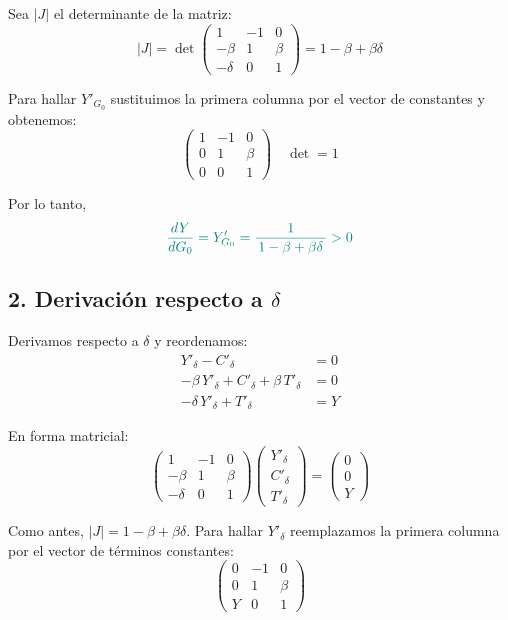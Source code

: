 \documentclass{article}
\begin{document}
Sea \(|J|\) el determinante de la matriz:
\[
|J|=\det
\begin{pmatrix}
1 & -1 & 0\\[0.8mm]
-\beta & 1 & \beta\\[0.8mm]
-\delta & 0 & 1
\end{pmatrix}
= 1 - \beta + \beta\delta
\]

Para hallar \(Y'_{G_0}\) sustituimos la primera columna por el vector de constantes y obtenemos:
\[
\begin{pmatrix}
1 & -1 & 0\\[0.8mm]
0 & 1 & \beta\\[0.8mm]
0 & 0 & 1
\end{pmatrix} \quad \det = 1
\]

Por lo tanto,
\[
\color{teal}
\frac{dY}{dG_0} = Y'_{G_0} = \frac{1}{\,1 - \beta + \beta\delta\,} > 0
\]

\bigskip
\subsection*{2. Derivación respecto a \(\delta\)}

Derivamos respecto a \(\delta\) y reordenamos:
\begin{align*}
Y'_{\delta} - C'_{\delta} &= 0 \\[1mm]
-\beta\,Y'_{\delta} + C'_{\delta} + \beta\,T'_{\delta} &= 0 \\[1mm]
-\delta\,Y'_{\delta} + T'_{\delta} &= Y
\end{align*}

En forma matricial:
\[
\begin{pmatrix}
1 & -1 & 0\\[0.8mm]
-\beta & 1 & \beta\\[0.8mm]
-\delta & 0 & 1
\end{pmatrix}
\begin{pmatrix}
Y'_{\delta}\\[0.8mm]
C'_{\delta}\\[0.8mm]
T'_{\delta}
\end{pmatrix}
=
\begin{pmatrix}
0\\[0.8mm]
0\\[0.8mm]
Y
\end{pmatrix}
\]

Como antes, \(|J| = 1 - \beta + \beta\delta\). Para hallar \(Y'_{\delta}\) reemplazamos la primera columna por el vector de términos constantes:
\[
\begin{pmatrix}
0 & -1 & 0\\[0.8mm]
0 & 1 & \beta\\[0.8mm]
Y & 0 & 1
\end{pmatrix}
\]
\end{document}
